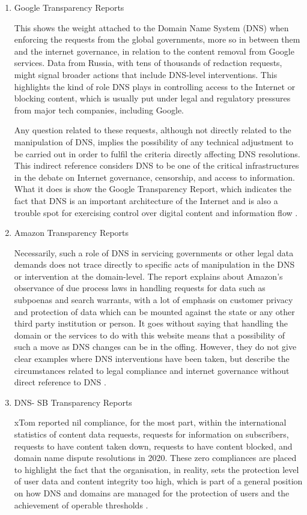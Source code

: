 \begin{enumerate}
\item Google Transparency Reports 

This shows the weight attached to the Domain Name System (DNS) when enforcing the requests from the global governments, more so in between them and the internet governance, in relation to the content removal from Google services. Data from Russia, with tens of thousands of redaction requests, might signal broader actions that include DNS-level interventions. This highlights the kind of role DNS plays in controlling access to the Internet or blocking content, which is usually put under legal and regulatory pressures from major tech companies, including Google.

Any question related to these requests, although not directly related to the manipulation of DNS, implies the possibility of any technical adjustment to be carried out in order to fulfil the criteria directly affecting DNS resolutions. This indirect reference considers DNS to be one of the critical infrastructures in the debate on Internet governance, censorship, and access to information. What it does is show the Google Transparency Report, which indicates the fact that DNS is an important architecture of the Internet and is also a trouble spot for exercising control over digital content and information flow \cite{Google2023}.

\item Amazon Transparency Reports 

Necessarily, such a role of DNS in servicing governments or other legal data demands does not trace directly to specific acts of manipulation in the DNS or intervention at the domain-level. The report explains about Amazon's observance of due process laws in handling requests for data such as subpoenas and search warrants, with a lot of emphasis on customer privacy and protection of data which can be mounted against the state or any other third party institution or person. It goes without saying that handling the domain or the services to do with this website means that a possibility of such a move as DNS changes can be in the offing. However, they do not give clear examples where DNS interventions have been taken, but describe the circumstances related to legal compliance and internet governance without direct reference to DNS \cite{Amazon2023}.

\item DNS- SB Transparency Reports

xTom reported nil compliance, for the most part, within the international statistics of content data requests, requests for information on subscribers, requests to have content taken down, requests to have content blocked, and domain name dispute resolutions in 2020. These zero compliances are placed to highlight the fact that the organisation, in reality, sets the protection level of user data and content integrity too high, which is part of a general position on how DNS and domains are managed for the protection of users and the achievement of operable thresholds \cite{DNSSB2023}.


\end{enumerate}
